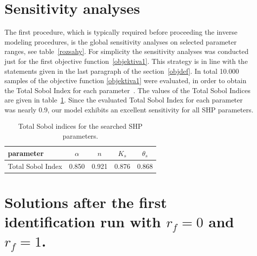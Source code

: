 \documentclass[review,times,3p,10pt]{elsarticle}
\begin{document}

 


\appendix
 \section{Sensitivity analyses} 

The first procedure, which is typically required before proceeding the inverse modeling procedures, is the global sensitivity analyses on  selected parameter ranges, see table~\ref{rozsahy}. For simplicity the sensitivity analyses was conducted just for the first objective function~\eqref{objektiva1}. This strategy is in line with the statements given in the last paragraph of the section~\ref{objdef}. In total 10.000 samples of the objective function \eqref{objektiva1}  were evaluated, in order to obtain the  Total Sobol Index for each parameter~\citep{kniha-citlivost}. The values of the Total Sobol Indices are given in table~\ref{citlivost}. Since the evaluated Total Sobol Index for each parameter was nearly 0.9, our model exhibits an excellent sensitivity for all SHP parameters. 

\begin{table}[ht]
\begin{center}
\caption{Total Sobol indices for the searched SHP parameters.}
\begin{small}
\doublespacing
\begin{tabular}{l||c c c c }
\toprule
parameter & $\alpha$ & $n$ & $K_s$ & $\theta_s$  \\ \hline
\toprule
Total Sobol Index & 0.850 & 0.921 & 0.876 & 0.868  \\
\toprule
\end{tabular}
\end{small}
\label{citlivost}
\end{center}
\end{table}

\section{Solutions after the first identification run with $r_f=0$ and $r_f=1$.}
\end{document}
